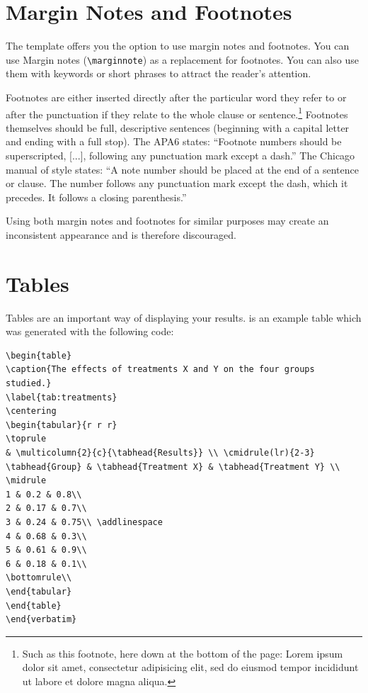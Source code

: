 \section{Margin Notes and Footnotes}

The template offers you the option to use margin notes and footnotes. You can use Margin notes (\verb|\marginnote|) as a replacement for footnotes. You can also use them with keywords or short phrases to attract the reader's attention.

Footnotes are either inserted directly after the particular word they refer to or after the punctuation if they relate to the whole clause or sentence.\footnote{Such as this footnote, here down at the bottom of the page: Lorem ipsum dolor sit amet, consectetur adipisicing elit, sed do eiusmod tempor incididunt ut labore et dolore magna aliqua.} Footnotes themselves should be full, descriptive sentences (beginning with a capital letter and ending with a full stop). The APA6 states: \enquote{Footnote numbers should be superscripted, [...], following any punctuation mark except a dash.} The Chicago manual of style states: \enquote{A note number should be placed at the end of a sentence or clause. The number follows any punctuation mark except the dash, which it precedes. It follows a closing parenthesis.}

Using both margin notes and footnotes for similar purposes may create an inconsistent appearance and is therefore discouraged.

\section{Tables}

Tables are an important way of displaying your results.  is an example table which was generated with the following code:

\begin{lstlisting}[language={[LaTeX]TeX}]
\begin{table}
\caption{The effects of treatments X and Y on the four groups studied.}
\label{tab:treatments}
\centering
\begin{tabular}{r r r}
\toprule
& \multicolumn{2}{c}{\tabhead{Results}} \\ \cmidrule(lr){2-3}
\tabhead{Group} & \tabhead{Treatment X} & \tabhead{Treatment Y} \\
\midrule
1 & 0.2 & 0.8\\
2 & 0.17 & 0.7\\
3 & 0.24 & 0.75\\ \addlinespace
4 & 0.68 & 0.3\\
5 & 0.61 & 0.9\\
6 & 0.18 & 0.1\\
\bottomrule\\
\end{tabular}
\end{table}
\end{verbatim}
\end{lstlisting}

